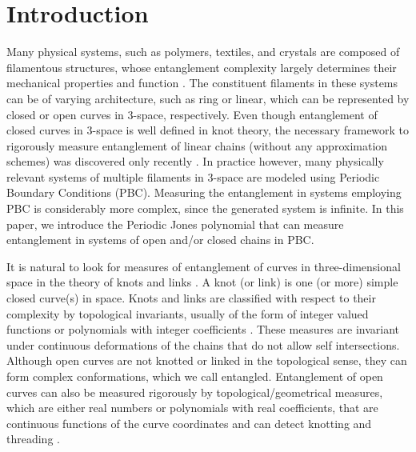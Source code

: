 \documentclass{article}
\begin{document}
\section{Introduction}

Many physical systems, such as polymers, textiles, and crystals are composed of filamentous structures, whose entanglement complexity largely determines their mechanical properties and function \cite{Arsuaga2005,Edwards1967,Liu2018,Panagiotou2019,Qin2011,Sulkowska2012,Taylor1974,Li2019,Zhang2022}. The constituent filaments in these systems can be of varying architecture, such as ring or linear, which can be represented by closed or open curves in 3-space, respectively. Even though entanglement of closed curves in 3-space is well defined in knot theory, the necessary framework to rigorously measure entanglement of linear chains (without any approximation schemes) was discovered only recently 
\cite{Panagiotou2015,Panagiotou2021,Panagiotou2020b,Wang2022,Panagiotou2011}.  In practice however, many physically relevant systems of multiple filaments in 3-space are modeled using Periodic Boundary Conditions (PBC). Measuring the entanglement in systems employing PBC is considerably more complex, since the generated system is infinite. In this paper, we introduce the Periodic Jones polynomial that can measure entanglement in systems of open and/or closed chains in PBC.

It is natural to look for measures of entanglement of curves in three-dimensional space in the theory of knots and links \cite{knot-book,Kauffman2001}. A knot (or link) is one (or more) simple closed curve(s) in space. Knots
and links are classified with respect to their complexity by topological invariants, usually of the form of integer valued functions or polynomials with integer coefficients \cite{Freyd1985,Kauffman1990,Przytycki1987}. These measures are invariant under continuous deformations of the chains that do not allow self intersections. Although open curves are not knotted or linked in the topological sense, they can form complex conformations, which we call entangled. Entanglement of open curves can also  be measured rigorously by topological/geometrical measures, which are either real numbers or polynomials with real coefficients, that are continuous functions of the curve coordinates and can detect knotting and threading \cite{Barkataki2022, Gauss1877, Panagiotou2020b, Panagiotou2021}.
\end{document}
